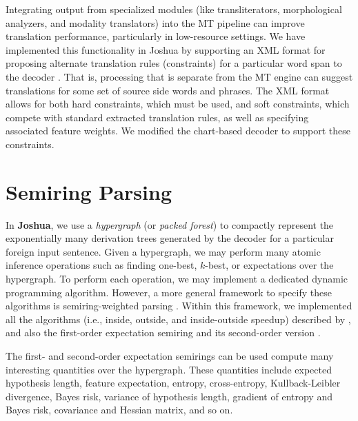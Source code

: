 \documentclass[11pt]{article}
\newcommand{\joshua}{\textbf{Joshua}\xspace}
\begin{document}
Integrating output from specialized modules (like transliterators, morphological analyzers, and modality translators) into the MT pipeline can improve translation performance, particularly in low-resource settings. We have implemented this functionality in Joshua by supporting an XML format for proposing alternate translation rules (constraints) for a particular word span to the decoder \cite{pbml-2010-Joshua-modules}. That is, processing that is separate from the MT engine can suggest translations for some set of source side words and phrases. The XML format allows for both hard constraints, which must be used, and soft constraints, which compete with standard extracted translation rules, as well as specifying associated feature weights. We modified the chart-based decoder to support these constraints. 

\section{Semiring Parsing}

In \joshua, we use a {\em hypergraph} (or {\em packed forest}) to compactly 
represent the exponentially many derivation trees generated by the decoder for a 
particular foreign input sentence.
Given a hypergraph, we may perform many atomic inference operations
such as finding one-best, $k$-best, or expectations over the hypergraph.
To perform each operation, we may implement a dedicated dynamic programming algorithm.
However, a more general framework to specify these algorithms is semiring-weighted parsing \cite{semiringparsing}.
Within this framework, we implemented all the algorithms (i.e.,
inside, outside, and inside-outside speedup) described by ,
and also the first-order expectation semiring \cite{eisner-expectation-semiring} and its
second-order version \cite{li-eisner:2009:EMNLP}.


The first- and second-order expectation semirings can be used compute many interesting quantities over the hypergraph.
These quantities include expected hypothesis length, feature expectation, entropy, cross-entropy, Kullback-Leibler divergence,
Bayes risk, variance of hypothesis length, gradient of entropy and Bayes risk, covariance and Hessian matrix, and so on.
\end{document}
